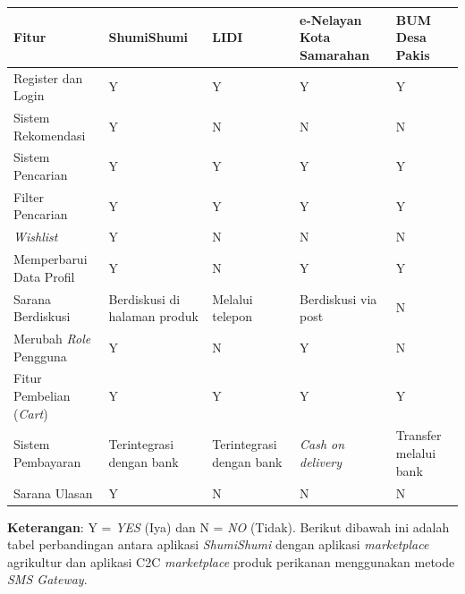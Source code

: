 \documentclass[a4paper]{article}
\begin{document}
\begin{centering}
\begin{longtable}{|p{3cm}|p{2cm}|p{2cm}|p{3cm}|p{2cm}|}
    \hline
    Fitur & ShumiShumi & LIDI & e-Nelayan Kota Samarahan & BUM Desa Pakis\\
    \hline
    Register dan Login & Y & Y & Y & Y\\
    \hline
    Sistem Rekomendasi & Y & N & N & N\\
    \hline
    Sistem Pencarian & Y & Y & Y & Y\\
    \hline
    Filter Pencarian & Y & Y & Y & Y\\
    \hline
    \textit{Wishlist} & Y & N & N & N\\
    \hline
    Memperbarui Data Profil & Y & N & Y & Y\\
    \hline
    Sarana Berdiskusi & Berdiskusi di halaman produk & Melalui telepon & Berdiskusi via post & N\\
    \hline
    Merubah \textit{Role} Pengguna & Y & N & Y & N\\
    \hline
    Fitur Pembelian (\textit{Cart}) & Y & Y & Y & Y\\
    \hline
    Sistem Pembayaran & Terintegrasi dengan bank & Terintegrasi dengan bank & \textit{Cash on delivery} & Transfer melalui bank\\
    \hline
    Sarana Ulasan & Y & N & N & N\\
    \hline
\end{longtable}
\end{centering}

\textbf{Keterangan}: Y = \textit{YES} (Iya) dan N = \textit{NO} (Tidak).
\newpage
Berikut dibawah ini adalah tabel perbandingan antara aplikasi \textit{ShumiShumi} dengan aplikasi \textit{marketplace} agrikultur\autocite{agriculture-marketplace} dan aplikasi C2C \textit{marketplace} produk perikanan menggunakan metode \textit{SMS Gateway}\autocite{c2c-fish-marketplace}.
\end{document}
